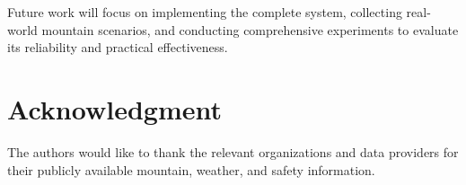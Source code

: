 \documentclass[conference]{IEEEtran}
\begin{document}
Future work will focus on implementing the complete system,
collecting real-world mountain scenarios, and conducting
comprehensive experiments to evaluate its reliability and
practical effectiveness.

\section*{Acknowledgment}

The authors would like to thank the relevant organizations
and data providers for their publicly available mountain,
weather, and safety information.



\end{document}
